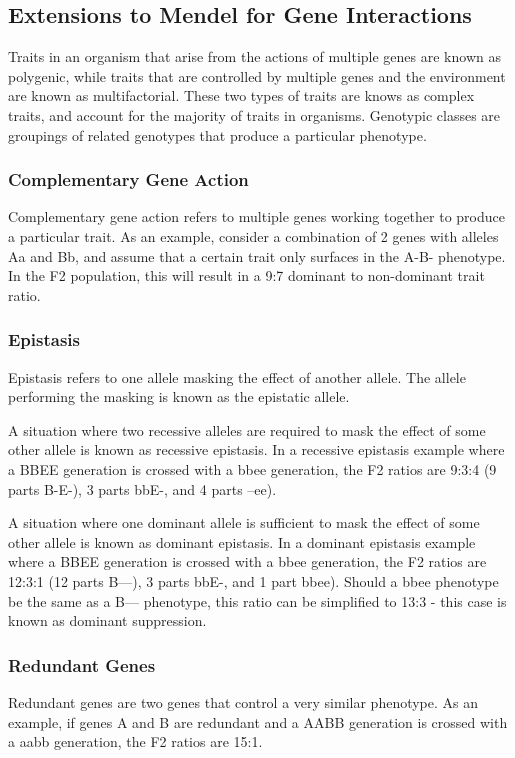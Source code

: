 \documentclass[12pt,titlepage]{article}
\begin{document}
      \subsection{Extensions to Mendel for Gene Interactions}
        Traits in an organism that arise from the actions of multiple genes are known as polygenic, while traits that are controlled by multiple genes and the environment
        are known as multifactorial. These two types of traits are knows as complex traits, and account for the majority of traits in organisms. Genotypic classes are
        groupings of related genotypes that produce a particular phenotype.

        \subsubsection{Complementary Gene Action}
          Complementary gene action refers to multiple genes working together to produce a particular trait. As an example, consider a combination of 2 genes with alleles
          Aa and Bb, and assume that a certain trait only surfaces in the A-B- phenotype. In the F2 population, this will result in a 9:7 dominant to non-dominant trait
          ratio.

        \subsubsection{Epistasis}
          Epistasis refers to one allele masking the effect of another allele. The allele performing the masking is known as the epistatic allele.

          A situation where two recessive alleles are required to mask the effect of some other allele is known as recessive epistasis. In a recessive
          epistasis example where a BBEE generation is crossed with a bbee generation, the F2 ratios are 9:3:4 (9 parts B-E-), 3 parts bbE-, and 4 parts --ee).

          A situation where one dominant allele is sufficient to mask the effect of some other allele is known as dominant epistasis. In a dominant
          epistasis example where a BBEE generation is crossed with a bbee generation, the F2 ratios are 12:3:1 (12 parts B---), 3 parts bbE-, and 1 part bbee).
          Should a bbee phenotype be the same as a B--- phenotype, this ratio can be simplified to 13:3 - this case is known as dominant suppression.

        \subsubsection{Redundant Genes}
          Redundant genes are two genes that control a very similar phenotype. As an example, if genes A and B are redundant and a AABB generation is crossed
          with a aabb generation, the F2 ratios are 15:1.
\end{document}
